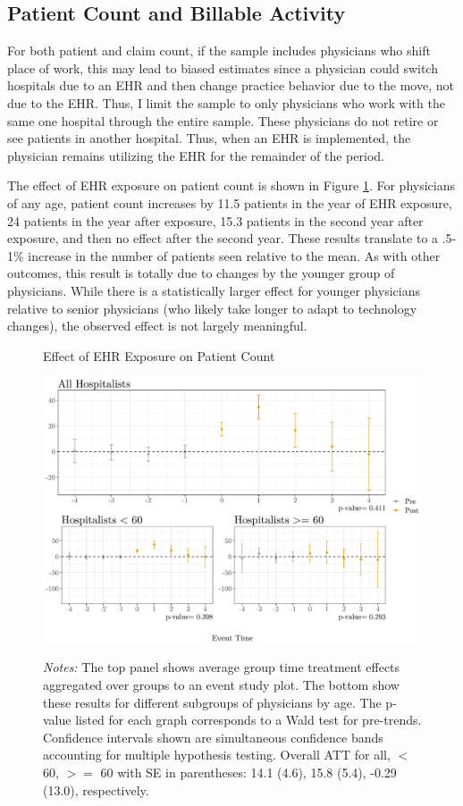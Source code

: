 \documentclass[11pt]{article}
\begin{document}
\subsection{Patient Count and Billable Activity}\label{sec:patientcount}

For both patient and claim count, if the sample includes physicians who shift place of work, this may lead to biased estimates since a physician could switch hospitals due to an EHR and then change practice behavior due to the move, not due to the EHR. Thus, I limit the sample to only physicians who work with the same one hospital through the entire sample. These physicians do not retire or see patients in another hospital. Thus, when an EHR is implemented, the physician remains utilizing the EHR for the remainder of the period. 

The effect of EHR exposure on patient count is shown in Figure \ref{fig:patient}. For physicians of any age, patient count increases by 11.5 patients in the year of EHR exposure, 24 patients in the year after exposure, 15.3 patients in the second year after exposure, and then no effect after the second year. These results translate to a .5-1\% increase in the number of patients seen relative to the mean. As with other outcomes, this result is totally due to changes by the younger group of physicians. While there is a statistically larger effect for younger physicians relative to senior physicians (who likely take longer to adapt to technology changes), the observed effect is not largely meaningful. 

\begin{figure}[ht]
    \centering
    \captionsetup{width=.85\linewidth}
    \caption{Effect of EHR Exposure on Patient Count}
    \includegraphics[scale=.65]{Objects/patient_plot.pdf}
    \label{fig:patient}
    \vspace{2mm}
    \caption*{\footnotesize{\textit{Notes:} The top panel shows average group time treatment effects aggregated over groups to an event study plot. The bottom show these results for different subgroups of physicians by age. The p-value listed for each graph corresponds to a Wald test for pre-trends. Confidence intervals shown are simultaneous confidence bands accounting for multiple hypothesis testing. Overall ATT for all, $<$ 60, $>=$ 60 with SE in parentheses: 14.1 (4.6), 15.8 (5.4), -0.29 (13.0), respectively.}}
\end{figure}
\end{document}
